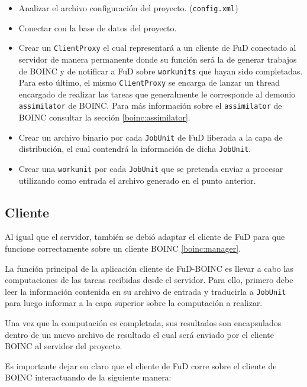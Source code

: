 \begin{itemize}
\item Analizar el archivo configuración del proyecto. (\texttt{config.xml})
\item Conectar con la base de datos del proyecto.
\item Crear un \texttt{ClientProxy} el cual representará a un cliente de FuD conectado al servidor de manera permanente donde su función será la de generar trabajos de BOINC y de notificar a FuD sobre \texttt{workunits} que hayan sido completadas. Para esto último, el mismo \texttt{ClientProxy} se encarga de lanzar un thread encargado de realizar las tareas que generalmente le corresponde al demonio \texttt{assimilator} de BOINC. Para más información sobre el \texttt{assimilator} de BOINC consultar la sección \ref{boinc:assimilator}.
\item Crear un archivo binario por cada \texttt{JobUnit} de FuD liberada a la capa de distribución, el cual contendrá la información de dicha \texttt{JobUnit}.
\item Crear una \texttt{workunit} por cada \texttt{JobUnit} que se pretenda enviar a procesar utilizando como entrada el archivo generado en el punto anterior. 
\end{itemize}

\subsection{Cliente}

Al igual que el servidor, también se debió adaptar el cliente de FuD para que funcione correctamente sobre un cliente BOINC \ref{boinc:manager}. 

La función principal de la aplicación cliente de FuD-BOINC es llevar a cabo las computaciones de las tareas recibidas desde el servidor. Para ello, primero debe leer la información contenida en su archivo de entrada y traducirla a \texttt{JobUnit} para luego informar a la capa superior sobre la computación a realizar.

Una vez que la computación es completada, sus resultados son encapsulados dentro de un nuevo archivo de resultado el cual será enviado por el cliente BOINC al servidor del proyecto.

Es importante dejar en claro que el cliente de FuD corre sobre el cliente de BOINC interactuando de la siguiente manera:

